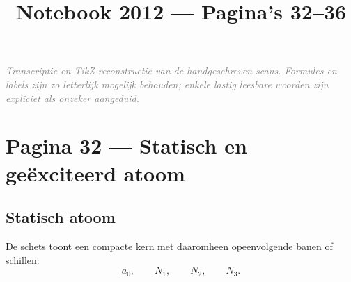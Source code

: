 \documentclass[10pt,a4paper]{article}
\title{Notebook 2012 --- Pagina's 32--36}
\author{}
\date{}
\newcommand{\uncertain}[1]{\textit{\textcolor{gray}{#1}}}
\newcommand{\atomcore}{
  \fill[noteRed!75] (-0.18,0.05) circle (0.19);
  \fill[noteRed!75] ( 0.18,0.05) circle (0.19);
  \fill[yellow!80!orange] (0,-0.22) circle (0.17);
  \fill[yellow!80!orange] (0, 0.30) circle (0.17);
  \draw[black!65] (-0.18,0.05) circle (0.19);
  \draw[black!65] ( 0.18,0.05) circle (0.19);
  \draw[black!65] (0,-0.22) circle (0.17);
  \draw[black!65] (0, 0.30) circle (0.17);
}
\newcommand{\shells}[1]{
  \foreach \r in {0.62,0.92,1.28,1.70}{\draw[black!70,line width=.7pt] (0,0) circle (\r);}
  #1
}
\begin{document}
\maketitle
\uncertain{Transcriptie en TikZ-reconstructie van de handgeschreven scans. Formules en labels zijn zo letterlijk mogelijk behouden; enkele lastig leesbare woorden zijn expliciet als onzeker aangeduid.}

\clearpage
\section*{Pagina 32 --- Statisch en geëxciteerd atoom}

\begin{minipage}[t]{0.47\textwidth}
\subsection*{Statisch atoom}

\begin{center}
\end{center}

De schets toont een compacte kern met daaromheen opeenvolgende banen of schillen:
\[
a_0,\qquad N_1,\qquad N_2,\qquad N_3.
\]
\end{minipage}
\hfill
\end{document}
